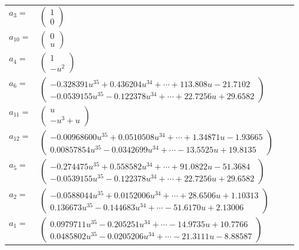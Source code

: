 \documentclass[1p]{elsarticle_modified}
\theoremstyle{definition}
\begin{document}
\begin{tabular}{m{7pt} m{180pt} m{7pt} m{180pt} }
\flushright $a_{3}=$&$\begin{pmatrix}1\\0\end{pmatrix}$ \\
\flushright $a_{10}=$&$\begin{pmatrix}0\\u\end{pmatrix}$ \\
\flushright $a_{4}=$&$\begin{pmatrix}1\\- u^2\end{pmatrix}$ \\
\flushright $a_{6}=$&$\begin{pmatrix}-0.328391 u^{35}+0.436204 u^{34}+\cdots+113.808 u-21.7102\\-0.0539155 u^{35}-0.122378 u^{34}+\cdots+22.7256 u+29.6582\end{pmatrix}$ \\
\flushright $a_{11}=$&$\begin{pmatrix}u\\- u^3+u\end{pmatrix}$ \\
\flushright $a_{12}=$&$\begin{pmatrix}-0.00968600 u^{35}+0.0510508 u^{34}+\cdots+1.34871 u-1.93665\\0.00857854 u^{35}-0.0342699 u^{34}+\cdots-13.5525 u+19.8135\end{pmatrix}$ \\
\flushright $a_{5}=$&$\begin{pmatrix}-0.274475 u^{35}+0.558582 u^{34}+\cdots+91.0822 u-51.3684\\-0.0539155 u^{35}-0.122378 u^{34}+\cdots+22.7256 u+29.6582\end{pmatrix}$ \\
\flushright $a_{2}=$&$\begin{pmatrix}-0.0588044 u^{35}+0.0152006 u^{34}+\cdots+28.6506 u+1.10313\\0.136673 u^{35}-0.144683 u^{34}+\cdots-51.6170 u+2.13006\end{pmatrix}$ \\
\flushright $a_{1}=$&$\begin{pmatrix}0.0979711 u^{35}-0.205251 u^{34}+\cdots-14.9735 u+10.7766\\0.0485802 u^{35}-0.0205206 u^{34}+\cdots-21.3111 u-8.88587\end{pmatrix}$ \\

\end{tabular}
\end{document}
